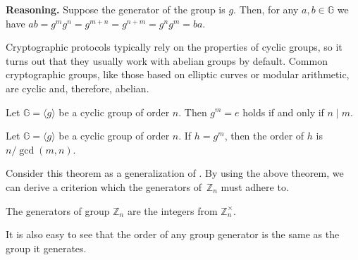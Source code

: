 \documentclass[../../book.tex]{subfiles}
\begin{document}
\textbf{Reasoning.} Suppose the generator of the group is $g$. Then, for any $a,b \in \mathbb{G}$ we have $ab = g^m g^n = g^{m+n} = g^{n+m} = g^n g^m = ba$.

\vspace{5px}
Cryptographic protocols typically rely on the properties of cyclic groups, so it
turns out that they usually work with abelian groups by default. Common
cryptographic groups, like those based on elliptic curves or modular arithmetic,
are cyclic and, therefore, abelian. 


\begin{lemma}\label{lemma:cyclic-group-order}
    Let $\mathbb{G}=\langle g \rangle$ be a cyclic group of order $n$. Then
    $g^{m} = e$ holds if and only if $n \mid m$.
\end{lemma}

\begin{theorem}
    Let $\mathbb{G}=\langle g \rangle$ be a cyclic group of order $n$. If $h =
    g^m$, then the order of $h$ is $n/\gcd(m, n)$. 
\end{theorem}

Consider this theorem as a generalization of . By
using the above theorem, we can derive a criterion which the generators
of~$\mathbb{Z}_n$ must adhere to.

\begin{corollary}\label{cor:}
    The generators of group $\mathbb{Z}_n$ are the integers from $\mathbb{Z}_n^{\times}$.
\end{corollary}

It is also easy to see that the order of any group generator is the same as the group it generates.
\end{document}
